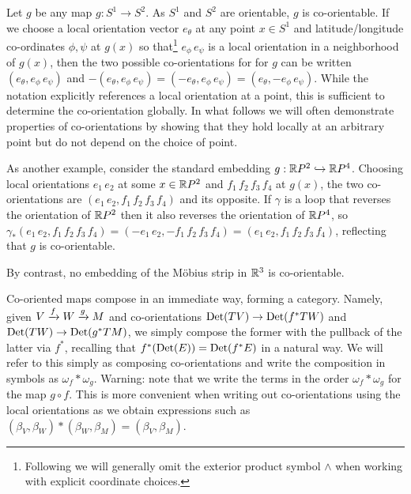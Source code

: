 \begin{example}
Let $g$ be any map $g: S^1\to S^2$. As $S^1$ and $S^2$ are orientable, $g$ is co-orientable.  If we choose a local orientation vector $e_{\theta}$ at any point $x\in S^1$ and latitude/longitude co-ordinates $\phi,\psi$ at $g(x)$ so that\footnote{Following \cite{BoTu82} we will generally omit the exterior product symbol $\wedge$ when working with explicit coordinate choices.} $e_\phi\, e_\psi$ is a local orientation in a neighborhood of $g(x)$, then the two possible co-orientations for for $g$ can be written $(e_\theta, e_\phi\, e_\psi)$ and $-(e_\theta, e_\phi\, e_\psi)=(-e_\theta, e_\phi \,e_\psi)=(e_\theta,- e_\phi\, e_\psi)$. While the notation explicitly references a local orientation at a point, this is sufficient to determine the co-orientation globally. In what follows we will often demonstrate properties of co-orientations by showing that they hold locally at an arbitrary point but do not depend on the choice of point.

As another example, consider the standard embedding $g:\mathbb{R} P^2\hookrightarrow \mathbb{R} P^4$. Choosing local orientations $e_1\,e_2$ at some $x\in \mathbb{R} P^2$ and $f_1\,f_2\,f_3\,f_4$ at $g(x)$, the two co-orientations are
$(e_1\,e_2, f_1\,f_2\,f_3\,f_4)$ and its opposite. If $\gamma$ is a loop  that reverses the orientation of $\mathbb{R} P^2$ then it also reverses the orientation of $\mathbb{R} P^4$, so $\gamma_*(e_1\,e_2, f_1\,f_2\,f_3\,f_4)=(-e_1\,e_2,- f_1\,f_2\,f_3\,f_4)=(e_1\,e_2, f_1\,f_2\,f_3\,f_4)$, reflecting that $g$ is co-orientable.

By contrast, no embedding of the M\"obius strip in $\mathbb{R}^3$ is co-orientable.
\end{example}


\begin{remark}\label{R: cooriented composition}
Co-oriented maps compose in an immediate way, forming a category.
Namely, given $V\xrightarrow{f} W\xrightarrow{g}M$ and co-orientations ${\rm Det}(TV)\to {\rm Det}(f^*TW)$ and ${\rm Det}(TW)\to {\rm Det}(g^*TM)$,  we simply compose the former  with the pullback of the latter via $f^*$, recalling that $f^*({\rm Det}(E))={\rm Det}(f^*E)$ in a natural way. We will refer to this simply as composing co-orientations and write the composition in symbols as $\omega_f*\omega_g$. Warning: note that we write the terms in the order $\omega_f*\omega_g$ for the map $g\circ f$. This is more convenient when writing out co-orientations using the local orientations as we obtain expressions such as $(\beta_V, \beta_W)*(\beta_W,\beta_M)=(\beta_V,\beta_M)$.
\end{remark}

